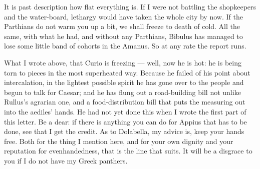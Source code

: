  It is past description how flat everything is. If I were not battling the shopkeepers and the water-board, lethargy would have taken the whole city by now. If the Parthians do not warm you up a bit, we shall freeze to death of cold. All the same, with what he had, and without any Parthians, Bibulus has managed to lose some little band of cohorts in the Amanus. So at any rate the report runs.

 What I wrote above, that Curio is freezing --- well, now he is hot: he is being torn to pieces in the most superheated way. Because he failed of his point about intercalation, in the lightest possible spirit he has gone over to the people and begun to talk for Caesar; and he has flung out a road-building bill not unlike Rullus's agrarian one, and a food-distribution bill that puts the measuring out into the aediles' hands. He had not yet done this when I wrote the first part of this letter. Be a dear: if there is anything you can do for Appius that has to be done, see that I get the credit. As to Dolabella, my advice is, keep your hands free. Both for the thing I mention here, and for your own dignity and your reputation for evenhandedness, that is the line that suits. It will be a disgrace to you if I do not have my Greek panthers.
